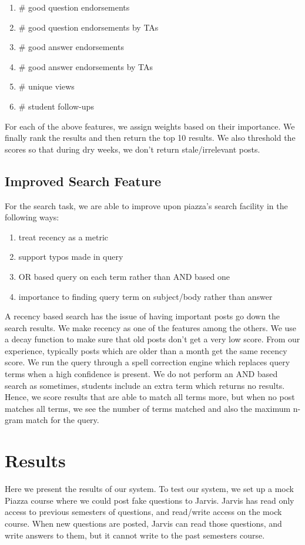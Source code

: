 \documentclass[sigconf]{acmart}
\begin{document}
\begin{enumerate}
  \item \# good question endorsements
  \item \# good question endorsements by TAs
  \item \# good answer endorsements
  \item \# good answer endorsements by TAs
  \item \# unique views
  \item \# student follow-ups
\end{enumerate}

For each of the above features, we assign weights based on their importance. We finally rank the results and then return the top 10 results. We also threshold the scores so that during dry weeks, we don't return stale/irrelevant posts.

\subsection{Improved Search Feature}
For the search task, we are able to improve upon piazza's search facility in the following ways:
\begin{enumerate}
\item treat recency as a metric
\item support typos made in query
\item OR based query on each term rather than AND based one
\item importance to finding query term on subject/body rather than answer
\end{enumerate}

A recency based search has the issue of having important posts go down the search results. We make recency as one of the features among the others. We use a decay function to make sure that old posts don't get a very low score. From our experience, typically posts which are older than a month get the same recency score. We run the query through a spell correction engine which replaces query terms when a high confidence is present. We do not perform an AND based search as sometimes, students include an extra term which returns no results. Hence, we score results that are able to match all terms more, but when no post matches all terms, we see the number of terms matched and also the maximum n-gram match for the query. 

\section{Results}
Here we present the results of our system.
To test our system, we set up a mock Piazza course where we could post fake questions to Jarvis. Jarvis has read only access to previous semesters of questions, and read/write access on the mock course. When new questions are posted, Jarvis can read those questions, and write answers to them, but it cannot write to the past semesters course.
\end{document}
